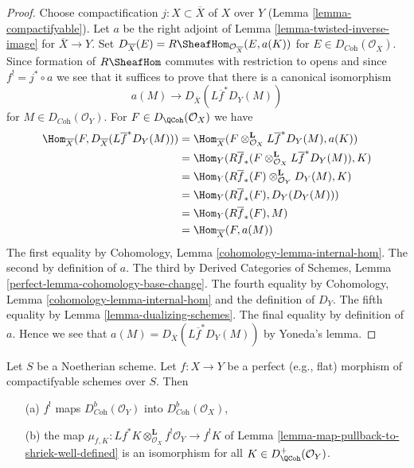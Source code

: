 \begin{proof}
Choose compactification $j : X \subset \overline{X}$ of $X$ over $Y$
(Lemma \ref{lemma-compactifyable}). Let $a$ be the
right adjoint of Lemma \ref{lemma-twisted-inverse-image} for
$\overline{X} \to Y$. Set
$D_{\overline{X}}(E) = R\SheafHom_{\mathcal{O}_{\overline{X}}}(E, a(K))$
for $E \in D_{\textit{Coh}}(\mathcal{O}_{\overline{X}})$.
Since formation of $R\SheafHom$ commutes with restriction to opens
and since $f^! = j^* \circ a$ we see that it suffices to prove that
there is a canonical isomorphism
$$
a(M) \longrightarrow D_{\overline{X}}(L\overline{f}^*D_Y(M))
$$
for $M \in D_{\textit{Coh}}(\mathcal{O}_Y)$. For
$F \in D_\QCoh(\mathcal{O}_X)$ we have
\begin{align*}
\Hom_{\overline{X}}(
F, D_{\overline{X}}(L\overline{f}^*D_Y(M)))
& =
\Hom_{\overline{X}}(
F \otimes_{\mathcal{O}_X}^\mathbf{L} L\overline{f}^*D_Y(M), a(K)) \\
& =
\Hom_Y(
R\overline{f}_*(F \otimes_{\mathcal{O}_X}^\mathbf{L} L\overline{f}^*D_Y(M)),
K) \\
& =
\Hom_Y(
R\overline{f}_*(F) \otimes_{\mathcal{O}_Y}^\mathbf{L} D_Y(M),
K) \\
& =
\Hom_Y(
R\overline{f}_*(F), D_Y(D_Y(M))) \\
& =
\Hom_Y(R\overline{f}_*(F), M) \\
& = \Hom_{\overline{X}}(F, a(M))
\end{align*}
The first equality by Cohomology, Lemma \ref{cohomology-lemma-internal-hom}.
The second by definition of $a$.
The third by Derived Categories of Schemes, Lemma
\ref{perfect-lemma-cohomology-base-change}.
The fourth equality by Cohomology, Lemma \ref{cohomology-lemma-internal-hom}
and the definition of $D_Y$.
The fifth equality by Lemma \ref{lemma-dualizing-schemes}.
The final equality by definition of $a$.
Hence we see that $a(M) = D_{\overline{X}}(L\overline{f}^*D_Y(M))$
by Yoneda's lemma.
\end{proof}

\begin{lemma}
\label{lemma-perfect-comparison-shriek}
Let $S$ be a Noetherian scheme. Let $f : X \to Y$ be a perfect
(e.g., flat) morphism of compactifyable schemes over $S$. Then
\begin{enumerate}
\item[(a)] $f^!$ maps $D_{\textit{Coh}}^b(\mathcal{O}_Y)$ into
$D_{\textit{Coh}}^b(\mathcal{O}_X)$,
\item[(b)] the map
$\mu_{f,  K} :
Lf^*K \otimes_{\mathcal{O}_X}^\mathbf{L} f^!\mathcal{O}_Y
\to
f^!K$
of Lemma \ref{lemma-map-pullback-to-shriek-well-defined}
is an isomorphism for all $K \in D_\QCoh^+(\mathcal{O}_Y)$.
\end{enumerate}
\end{lemma}

